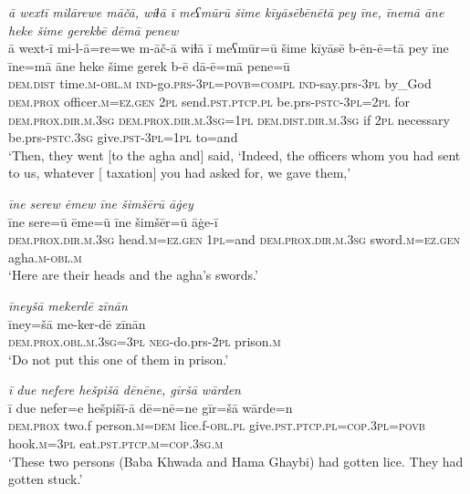 \ea \label{BP.124}
\textit{ā wextī milārewe māčā, wiɫā ī meʕmūrū šime kīyāsēbēnētā pey īne, īnemā āne heke šime gerekbē dēmā penew} \\ 
\gll ā wext-ī mi-l-ā=re=we m-āč-ā wiɫā ī meʕmūr=ū šime kīyāsē b-ēn-ē=tā pey īne īne=mā āne heke šime gerek b-ē dā-ē=mā pene=ū \\ 
 \textsc{dem.dist} time\textsc{.m}\textsc{-obl}\textsc{.m} \textsc{ind-}go.\textsc{prs}\textsc{-3pl}\textsc{=\textsc{povb}}\textsc{=compl} \textsc{ind-}say.prs\textsc{-3pl} by\_God \textsc{dem.prox} officer\textsc{.m}\textsc{=ez.gen} \textsc{2pl} send\textsc{.pst}\textsc{.ptcp}\textsc{.pl} be.prs\textsc{-pstc}\textsc{-3pl}=\textsc{2pl} for \textsc{dem.prox}\textsc{.dir}\textsc{.m}\textsc{.3sg} \textsc{dem.prox}\textsc{.dir}\textsc{.m}\textsc{.3sg}\textsc{=\textsc{1pl}} \textsc{dem.dist}\textsc{.dir}\textsc{.m}\textsc{.3sg} if \textsc{2pl} necessary be.prs\textsc{-pstc}\textsc{.3sg} give\textsc{.pst}\textsc{-3pl}\textsc{=\textsc{1pl}} to=and \\ 
\glt `Then, they went [to the agha and] said, ‘Indeed, the officers whom you had sent to us, whatever [ taxation] you had asked for, we gave them,'
\z 
 
\ea \label{BP.128}
\textit{īne serew ēmew īne šimšērū āġey} \\ 
\gll īne sere=ū ēme=ū īne šimšēr=ū āġe-ī \\ 
 \textsc{dem.prox}\textsc{.dir}\textsc{.m}\textsc{.3sg} head\textsc{.m}\textsc{=ez.gen} \textsc{1pl}=and \textsc{dem.prox}\textsc{.dir}\textsc{.m}\textsc{.3sg} sword\textsc{.m}\textsc{=ez.gen} agha\textsc{.m}\textsc{-obl}\textsc{.m} \\ 
\glt `Here are their heads and the agha’s swords.'
\z 
 
\ea \label{BP.133}
\textit{īneyšā mekerdē zīnān} \\ 
\gll īney=šā me-ker-dē zīnān \\ 
 \textsc{dem.prox}\textsc{.obl}\textsc{.m}\textsc{.3sg}\textsc{=3pl} \textsc{neg-}do.prs-\textsc{2pl} prison\textsc{.m} \\ 
\glt `Do not put this one of them in prison.'
\z 
 
\ea \label{BP.150}
\textit{ī due nefere hešpišā dēnēne, gīršā wārden} \\ 
\gll ī due nefer=e hešpišī-ā dē=nē=ne gīr=šā wārde=n \\ 
 \textsc{dem.prox} two.f person\textsc{.m}\textsc{=dem} lice.f\textsc{-obl}\textsc{.pl} give\textsc{.pst}\textsc{.ptcp}\textsc{.pl}\textsc{=cop}\textsc{.3pl}\textsc{=\textsc{povb}} hook\textsc{.m}\textsc{=3pl} eat\textsc{.pst}\textsc{.ptcp}\textsc{.m}\textsc{=cop}\textsc{.3sg}\textsc{.m} \\ 
\glt `These two persons (Baba Khwada and Hama Ghaybi) had gotten lice. They had gotten stuck.'
\z 
 
